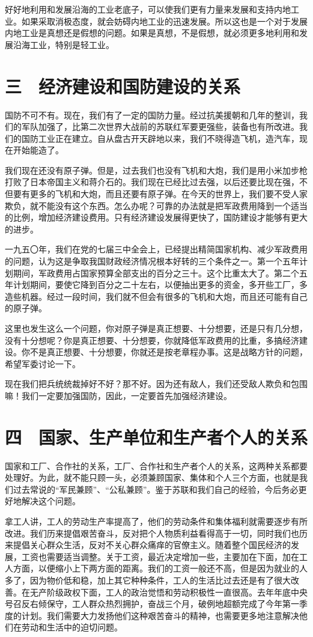 好好地利用和发展沿海的工业老底子，可以使我们更有力量来发展和支持内地工业。如果采取消极态度，就会妨碍内地工业的迅速发展。所以这也是一个对于发展内地工业是真想还是假想的问题。如果是真想，不是假想，就必须更多地利用和发展沿海工业，特别是轻工业。

\section{三　经济建设和国防建设的关系}

国防不可不有。现在，我们有了一定的国防力量。经过抗美援朝和几年的整训，我们的军队加强了，比第二次世界大战前的苏联红军要更强些，装备也有所改进。我们的国防工业正在建立。自从盘古开天辟地以来，我们不晓得造飞机，造汽车，现在开始能造了。

我们现在还没有原子弹。但是，过去我们也没有飞机和大炮，我们是用小米加步枪打败了日本帝国主义和蒋介石的。我们现在已经比过去强，以后还要比现在强，不但要有更多的飞机和大炮，而且还要有原子弹。在今天的世界上，我们要不受人家欺负，就不能没有这个东西。怎么办呢？可靠的办法就是把军政费用降到一个适当的比例，增加经济建设费用。只有经济建设发展得更快了，国防建设才能够有更大的进步。

一九五〇年，我们在党的七届三中全会上，已经提出精简国家机构、减少军政费用的问题，认为这是争取我国财政经济情况根本好转的三个条件之一。第一个五年计划期间，军政费用占国家预算全部支出的百分之三十。这个比重太大了。第二个五年计划期间，要使它降到百分之二十左右，以便抽出更多的资金，多开些工厂，多造些机器。经过一段时间，我们就不但会有很多的飞机和大炮，而且还可能有自己的原子弹。

这里也发生这么一个问题，你对原子弹是真正想要、十分想要，还是只有几分想，没有十分想呢？你是真正想要、十分想要，你就降低军政费用的比重，多搞经济建设。你不是真正想要、十分想要，你就还是按老章程办事。这是战略方针的问题，希望军委讨论一下。

现在我们把兵统统裁掉好不好？那不好。因为还有敌人，我们还受敌人欺负和包围嘛！我们一定要加强国防，因此，一定要首先加强经济建设。

\section{四　国家、生产单位和生产者个人的关系}

国家和工厂、合作社的关系，工厂、合作社和生产者个人的关系，这两种关系都要处理好。为此，就不能只顾一头，必须兼顾国家、集体和个人三个方面，也就是我们过去常说的“军民兼顾”、“公私兼顾”。鉴于苏联和我们自己的经验，今后务必更好地解决这个问题。

拿工人讲，工人的劳动生产率提高了，他们的劳动条件和集体福利就需要逐步有所改进。我们历来提倡艰苦奋斗，反对把个人物质利益看得高于一切，同时我们也历来提倡关心群众生活，反对不关心群众痛痒的官僚主义。随着整个国民经济的发展，工资也需要适当调整。关于工资，最近决定增加一些，主要加在下面，加在工人方面，以便缩小上下两方面的距离。我们的工资一般还不高，但是因为就业的人多了，因为物价低和稳，加上其它种种条件，工人的生活比过去还是有了很大改善。在无产阶级政权下面，工人的政治觉悟和劳动积极性一直很高。去年年底中央号召反右倾保守，工人群众热烈拥护，奋战三个月，破例地超额完成了今年第一季度的计划。我们需要大力发扬他们这种艰苦奋斗的精神，也需要更多地注意解决他们在劳动和生活中的迫切问题。

